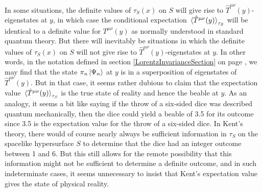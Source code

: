In some situations, the definite values of $\tau_S(x)$ on $S$ will give rise to $\hat{T}^{\mu\nu}(y)$-eigenstates at $y$, in which case the conditional expectation $\ev*{\hat{T}^{\mu\nu}(y)}_{\tau_S}$ will be identical to a definite value for $T^{\mu\nu}(y)$ as normally understood in standard quantum theory. But there will inevitably be situations in which the definite values of $\tau_S(x)$ on $S$ will not give rise to  $\hat{T}^{\mu\nu}(y)$-eigenstates at $y$. In other words, in the notation defined in section \ref{LorentzInvarianceSection} on page \pageref{tauprojection}, we may find that the state $\pi_n\ket{\Psi_n}$ at $y$ is in a superposition of eigenstates of $\hat{T}^{\mu\nu}(y)$. But in that case, it seems rather dubious to claim that the expectation value $\ev*{\hat{T}^{\mu\nu}(y)}_{\tau_S}$ is the true state of reality and hence the beable at $y$. As an analogy, it seems a bit like saying if the throw of a six-sided dice was described quantum mechanically, then the dice could yield a beable of 3.5 for its outcome since 3.5 is the expectation value for the throw of a six-sided dice. In Kent's theory, there would of course nearly always be sufficient information in $\tau_S$ on the spacelike hypersurface $S$  to determine that the dice had an integer outcome between 1 and 6.  But this still allows for the remote possibility that this information might not be sufficient to determine a definite outcome, and in such indeterminate cases, it seems unnecessary to insist that Kent's expectation value gives the state of physical reality. 

